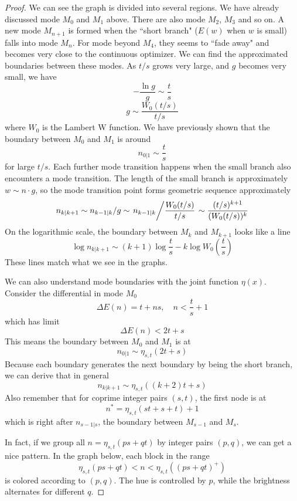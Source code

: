 \documentclass[]{article}
\begin{document}
\begin{proof}
	We can see the graph is divided into several regions. We have already discussed mode $M_0$ and $M_1$ above. There are also mode $M_2$, $M_3$ and so on. A new mode $M_{n+1}$ is formed when the ``short branch" ($E(w)$ when $w$ is small) falls into mode $M_n$. For mode beyond $M_4$, they seems to ``fade away" and becomes very close to the continuous optimizer. We can find the approximated boundaries between these modes. As $t/s$ grows very large, and $g$ becomes very small, we have
	\[
		-\frac{\ln g}{g}\sim \frac{t}{s}
	\]
	\[
		g \sim \frac{W_0(t/s)}{t/s}
	\]
	where $W_0$ is the Lambert W function. We have previously shown that the boundary between $M_0$ and $M_1$ is around
	\[
		n_{0|1}\sim \frac{t}{s}
	\]
	for large $t/s$. Each further mode transition happens when the small branch also encounters a mode transition. The length of the small branch is approximately $w \sim n\cdot g$, so the mode transition point forms geometric sequence approximately
	\[
		n_{k| k+1} \sim n_{k-1| k}/g \sim \left.n_{k-1| k}\middle/\frac{W_0(t/s)}{t/s}\right. \sim \frac{(t/s)^{k+1}}{(W_0(t/s))^{k}}
	\]
	On the logarithmic scale, the boundary between $M_k$ and $M_{k+1}$ looks like a line 
	\[
		\log n_{k| k+1} \sim (k + 1) \log\frac{t}{s} - k\log W_0\left(\frac{t}{s}\right)
	\]
	These lines match what we see in the graphs.
	
	We can also understand mode boundaries with the joint function $\eta(x)$. Consider the differential in mode $M_0$
	\[
	\Delta E(n) = t + ns, \quad n < \frac{t}{s} + 1
	\]
	which has limit
	\[
	\Delta E(n) < 2t + s
	\]
	This means the boundary between $M_0$ and $M_1$ is at
	\[
	n_{0|1} \sim \eta_{s,t}(2t + s)
	\]
	Because each boundary generates the next boundary by being the short branch, we can derive that in general
	\[
	n_{k|k+1} \sim \eta_{s,t}((k+2)t + s)
	\]
	Also remember that for coprime integer pairs $(s, t)$, the first node is at
	\[
	n^* = \eta_{s,t}(st + s + t) + 1
	\]
	which is right after $n_{s-1|s}$, the boundary between $M_{s-1}$ and $M_s$.
	
	In fact, if we group all $n = \eta_{s,t}(ps + qt)$ by integer pairs $(p, q)$, we can get a nice pattern. In the graph below, each block in the range
	\[
	\eta_{s,t}(ps + qt) < n < \eta_{s,t}((ps + qt)^+)
	\] 
	is colored according to $(p, q)$. The hue is controlled by $p$, while the brightness alternates for different $q$.
	

\end{proof}
\end{document}

